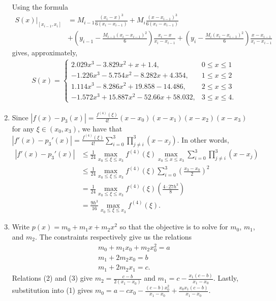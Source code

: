 \documentclass[a4paper,12pt]{article}
\begin{document}
\begin{enumerate}
        Using the formula
        \begin{align*}
            S(x)|_{[x_{i - 1}, x_i]} &= M_{i - 1} \frac{(x_i - x)^3}{6(x_i - x_{i - 1})} + M_i \frac{(x - x_{i - 1})^3}{6(x_i - x_{i - 1})} \\
            &+ \left( y_{i - 1} - \frac{M_{i - 1} \left( x_i - x_{i - 1} \right)^2}{6} \right) \frac{x_i - x}{x_i - x_{i - 1}} + \left( y_i - \frac{M_i (x_i - x_{i - 1})^2}{6} \right) \frac{x - x_{i - 1}}{x_i - x_{i - 1}}
        \end{align*}
        gives, approximately,
        \begin{align*}
            S(x) = \begin{cases}
                2.029x^3 - 3.829x^2 + x + 1.4, &0 \leq x \leq 1 \\
                -1.226x^3 - 5.754x^2 - 8.282x + 4.354, &1 \leq x \leq 2 \\
                1.114x^3 - 8.286x^2 + 19.858 - 14.486, &2 \leq x \leq 3 \\
                -1.572x^3 + 15.887x^2 - 52.66x + 58.032, &3 \leq x \leq 4.
            \end{cases}
        \end{align*}

    \item
        Since $|f(x) - p_3(x)| = \frac{f^{(4)}(\xi)}{4!}(x - x_0)(x - x_1)(x - x_2)(x - x_3)$ for any $\xi \in (x_0, x_3)$, we have that $|f'(x) - p_3'(x)| = \frac{f^{(4)}(\xi)}{4!} \sum_{i = 0}^3 \prod_{j \neq i}^3 (x - x_j)$. In other words,
        \begin{align*}
            |f'(x) - p_3'(x)| &\leq \frac{1}{24} \max_{x_0 \leq \xi \leq x_3} f^{(4)}(\xi) \max_{x_0 \leq x \leq x_3} \sum_{i = 0}^3 \prod_{j \neq i}^3 (x - x_j) \\
            &\leq \frac{1}{24} \max_{x_0 \leq \xi \leq x_3} f^{(4)}(\xi) \sum_{i = 0}^3 \left( \frac{x_3 - x_0}{2} \right)^2 \\
            &= \frac{1}{24} \max_{x_0 \leq \xi \leq x_3} f^{(4)}(\xi) \left( \frac{4 \cdot 27h^3}{8} \right) \\
            &= \frac{9h^3}{16} \max_{x_0 \leq \xi \leq x_3} f^{(4)}(\xi).
        \end{align*}

    \item
        Write $p(x) = m_0 + m_1 x + m_2 x^2$ so that the objective is to solve for $m_0$, $m_1$, and $m_2$. The constraints respectively give us the relations
        \begin{gather}
            m_0 + m_1 x_0 + m_2 x_0^2 = a \\
            m_1 + 2m_2 x_0 = b \\
            m_1 + 2m_2 x_1 = c.
        \end{gather}
        Relations (2) and (3) give $m_2 = \frac{c - b}{2(x_1 - x_0)}$ and $m_1 = c - \frac{x_1(c - b)}{x_1 - x_0}$. Lastly, substitution into (1) gives $m_0 = a - cx_0 - \frac{(c - b)x_0^2}{x_1 - x_0} + \frac{x_0 x_1 (c - b)}{x_1 - x_0}$.


\end{enumerate}
\end{document}
